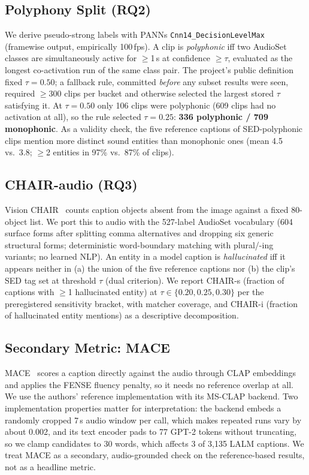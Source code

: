 \documentclass[conference]{IEEEtran}
\begin{document}
\subsection{Polyphony Split (RQ2)}
We derive pseudo-strong labels with PANNs
\texttt{Cnn14\_DecisionLevelMax}~\cite{kong2020panns} (framewise output,
empirically 100\,fps). A clip is \emph{polyphonic} iff two AudioSet classes
are simultaneously active for $\geq$1\,s at confidence $\geq\tau$, evaluated
as the longest co-activation run of the same class pair. The project's public
definition fixed $\tau{=}0.50$; a fallback rule, committed \emph{before} any
subset results were seen, required $\geq$300 clips per bucket and otherwise
selected the largest stored $\tau$ satisfying it. At $\tau{=}0.50$ only 106
clips were polyphonic (609 clips had no activation at all), so the rule
selected $\tau{=}0.25$: \textbf{336 polyphonic / 709 monophonic}. As a
validity check, the five reference captions of SED-polyphonic clips mention
more distinct sound entities than monophonic ones (mean 4.5 vs.\ 3.8;
$\geq$2 entities in 97\% vs.\ 87\% of clips).

\subsection{CHAIR-audio (RQ3)}
Vision CHAIR~\cite{rohrbach2018chair} counts caption objects absent from the
image against a fixed 80-object list. We port this to audio with the 527-label
AudioSet vocabulary (604 surface forms after splitting comma alternatives and
dropping six generic structural forms;
deterministic word-boundary matching with plural/-ing variants; no learned NLP).
An entity in a model caption is \emph{hallucinated} iff it appears neither in
(a) the union of the five reference captions nor (b) the clip's SED tag set at
threshold $\tau$ (dual criterion). We report CHAIR-s (fraction of captions with
$\geq$1 hallucinated entity) at $\tau\in\{0.20,0.25,0.30\}$ per the
preregistered sensitivity bracket, with matcher coverage, and CHAIR-i (fraction
of hallucinated entity mentions) as a descriptive decomposition.

\subsection{Secondary Metric: MACE}
MACE~\cite{dixit2024mace} scores a caption directly against the audio through
CLAP embeddings and applies the FENSE fluency penalty, so it needs no
reference overlap at all. We use the authors' reference implementation with
its MS-CLAP backend. Two implementation properties matter for interpretation:
the backend embeds a randomly cropped 7\,s audio window per call, which makes
repeated runs vary by about 0.002, and its text encoder pads to 77 GPT-2
tokens without truncating, so we clamp candidates to 30 words, which affects
3 of 3{,}135 LALM captions. We treat MACE as a secondary, audio-grounded
check on the reference-based results, not as a headline metric.
\end{document}
